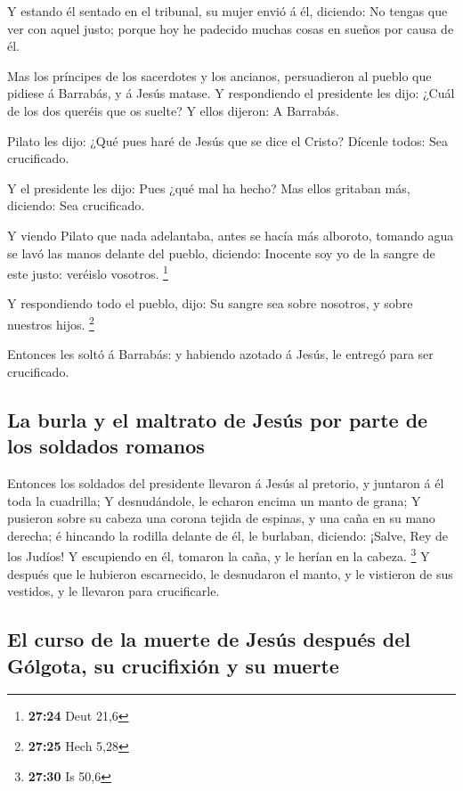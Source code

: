  Y estando él sentado en el tribunal, su mujer envió á
él, diciendo: No tengas que ver con aquel justo; porque hoy he padecido
muchas cosas en sueños por causa de él.

 Mas los príncipes de los sacerdotes y los ancianos,
persuadieron al pueblo que pidiese á Barrabás, y á Jesús matase.
 Y respondiendo el presidente les dijo: ¿Cuál de los dos
queréis que os suelte? Y ellos dijeron: A Barrabás.

 Pilato les dijo: ¿Qué pues haré de Jesús que se dice el
Cristo? Dícenle todos: Sea crucificado.

 Y el presidente les dijo: Pues ¿qué mal ha hecho? Mas
ellos gritaban más, diciendo: Sea crucificado.

 Y viendo Pilato que nada adelantaba, antes se hacía más
alboroto, tomando agua se lavó las manos delante del pueblo, diciendo:
Inocente soy yo de la sangre de este justo: veréislo vosotros.
\footnote{\textbf{27:24} Deut 21,6}

 Y respondiendo todo el pueblo, dijo: Su sangre sea sobre
nosotros, y sobre nuestros hijos. \footnote{\textbf{27:25} Hech 5,28}

 Entonces les soltó á Barrabás: y habiendo azotado á
Jesús, le entregó para ser crucificado.

\hypertarget{la-burla-y-el-maltrato-de-jesuxfas-por-parte-de-los-soldados-romanos}{%
\subsection{La burla y el maltrato de Jesús por parte de los soldados
romanos}\label{la-burla-y-el-maltrato-de-jesuxfas-por-parte-de-los-soldados-romanos}}

 Entonces los soldados del presidente llevaron á Jesús al
pretorio, y juntaron á él toda la cuadrilla;  Y
desnudándole, le echaron encima un manto de grana;  Y
pusieron sobre su cabeza una corona tejida de espinas, y una caña en su
mano derecha; é hincando la rodilla delante de él, le burlaban,
diciendo: ¡Salve, Rey de los Judíos!  Y escupiendo en él,
tomaron la caña, y le herían en la cabeza. \footnote{\textbf{27:30} Is
  50,6}  Y después que le hubieron escarnecido, le
desnudaron el manto, y le vistieron de sus vestidos, y le llevaron para
crucificarle.

\hypertarget{el-curso-de-la-muerte-de-jesuxfas-despuuxe9s-del-guxf3lgota-su-crucifixiuxf3n-y-su-muerte}{%
\subsection{El curso de la muerte de Jesús después del Gólgota, su
crucifixión y su
muerte}\label{el-curso-de-la-muerte-de-jesuxfas-despuuxe9s-del-guxf3lgota-su-crucifixiuxf3n-y-su-muerte}}

